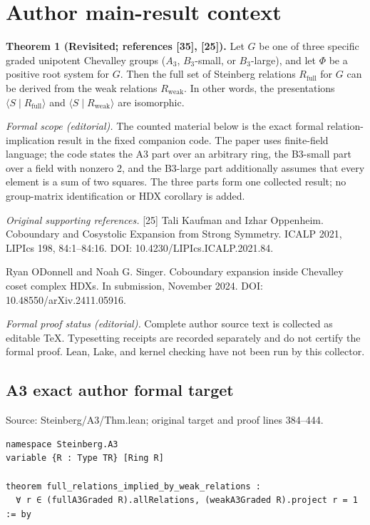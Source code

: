 \documentclass[10pt,a4paper]{article}
\begin{document}
\section*{Author main-result context}
\textbf{Theorem 1 (Revisited; references [35], [25]).}
Let $G$ be one of three specific graded unipotent Chevalley groups ($A_{3}$, $B_{3}$-small, or $B_{3}$-large),
and let $\Phi$ be a positive root system for $G$.
Then the full set of Steinberg relations $R_{\text{full}}$ for $G$ can be derived from the weak relations $R_{\text{weak}}$.
In other words,
the presentations $\langle S\mid R_{\text{full}}\rangle$ and $\langle S\mid R_{\text{weak}}\rangle$ are isomorphic.
\par\medskip
\noindent\textit{Formal scope (editorial).} The counted material below is the exact formal relation-implication result in the fixed companion code. The paper uses finite-field language; the code states the A3 part over an arbitrary ring, the B3-small part over a field with nonzero 2, and the B3-large part additionally assumes that every element is a sum of two squares. The three parts form one collected result; no group-matrix identification or HDX corollary is added.
\par\medskip
\noindent\textit{Original supporting references.} [25] Tali Kaufman and Izhar Oppenheim. Coboundary and Cosystolic Expansion from Strong Symmetry. ICALP 2021, LIPIcs 198, 84:1--84:16. DOI: 10.4230/LIPIcs.ICALP.2021.84.
\par
\noindent [35] Ryan O\textquotesingle Donnell and Noah G. Singer. Coboundary expansion inside Chevalley coset complex HDXs. In submission, November 2024. DOI: 10.48550/arXiv.2411.05916.
\par\medskip
\noindent\textit{Formal proof status (editorial).} Complete author source text is collected as editable TeX. Typesetting receipts are recorded separately and do not certify the formal proof. Lean, Lake, and kernel checking have not been run by this collector.

\subsection*{A3 exact author formal target}
\noindent Source: Steinberg/A3/Thm.lean; original target and proof lines 384--444.
\begin{Verbatim}
namespace Steinberg.A3
variable {R : Type TR} [Ring R]

theorem full_relations_implied_by_weak_relations :
  ∀ r ∈ (fullA3Graded R).allRelations, (weakA3Graded R).project r = 1 := by
\end{Verbatim}
\end{document}
